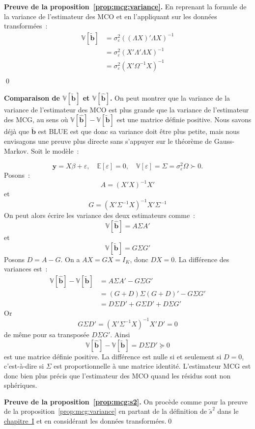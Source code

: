 \documentclass[10pt,a4paper]{article}
\newcommand{\siteurl}{https://le-mans.adjemian.eu/econometrics}
\newcommand{\chapref}[2]{\href{\siteurl/chapitre-#1.pdf}{chapitre~#2}}
\theoremstyle{definition}
\begin{document}
\begin{notes}

  \textbf{Preuve de la proposition~\ref{prop:mcg:variance}.} En reprenant la formule de la variance de l'estimateur des MCO et en l'appliquant sur les données transformées~:
  \[
    \begin{split}
      \mathbb V \left[\tilde{\mathbf b}\right] &= \sigma_{\varepsilon}^2\left((\Lambda X)'\Lambda X  \right)^{-1}\\
                                                &= \sigma_{\varepsilon}^2\left(X'\Lambda'\Lambda X  \right)^{-1}\\
                                                &= \sigma_{\varepsilon}^2\left(X'\Omega^{-1} X \right)^{-1}\\
    \end{split}
  \]
  \qed

  \bigskip

  \textbf{Comparaison de $\mathbb V [\tilde{\mathbf b}]$
    et $\mathbb V [\hat{\mathbf b}]$.} On peut montrer que la
  variance de la variance de l'estimateur des MCO est plus grande que
  la variance de l'estimateur des MCG, au sens
  où $\mathbb V [\hat{\mathbf b}]-\mathbb V [\tilde{\mathbf b}]$ est
  une matrice définie positive. Nous savons déjà
  que $\tilde{\mathbf b}$ est BLUE est que donc sa variance doit être
  plus petite, mais nous envisagons une preuve plus directe sans
  s'appuyer sur le théorème de Gauss-Markov. Soit le modèle~:

  \[
\mathbf y=X\beta+\varepsilon,\quad \mathbb E[\varepsilon]=0,\quad \mathbb V[\varepsilon]=\Sigma = \sigma_{\varepsilon}^2\Omega\succ 0.
\]
Posons~:
\[
  A = (X'X)^{-1}X'
\]
et
\[
  G = (X'\Sigma^{-1}X)^{-1}X'\Sigma^{-1}
\]
On peut alors écrire les variance des deux estimateurs comme~:
\[
\mathbb V[\hat{\mathbf b}] = A\Sigma A'
\]
et
\[
\mathbb V[\tilde{\mathbf b}] = G\Sigma G'
\]
Posons \(D=A-G\). On a \(AX=GX=I_K\), donc \(DX=0\). La différence des variances est~:
\[
  \begin{split}
    \mathbb V[\hat{\mathbf b}]-\mathbb V[\tilde{\mathbf b}] &= A\Sigma A' - G\Sigma G'\\
&= (G+D)\Sigma(G+D)' - G\Sigma G'\\
&= D\Sigma D' + G\Sigma D' + D\Sigma G'
  \end{split}
\]
Or
\[
G\Sigma D' = (X'\Sigma^{-1}X)^{-1}X'D' = 0
\]
de même pour sa transposée $D\Sigma G'$. Ainsi
\[
  \mathbb V[\hat{\mathbf b}]-\mathbb V[\tilde{\mathbf b}] = D\Sigma D' \succeq 0
\]
est une matrice définie positive. La différence est nulle si et
seulement si $D=0$, c'est-à-dire si $\Sigma$ est proportionnelle à une
matrice identité. L'estimateur MCG est donc bien plus précis que
l'estimateur des MCO quand les résidus sont non sphériques.

\bigskip

\textbf{Preuve de la proposition~\ref{prop:mcg:s2}.} On procède comme
pour la preuve de la proposition~\ref{prop:mcg:variance} en partant de
la définition de $\tilde{s}^2$ dans le \chapref{1}{I} et
en considérant les données transformées.\qed

\end{notes}
\end{document}
